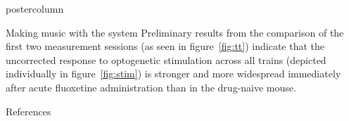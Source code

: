 \documentclass{beamer}
\begin{document}
\begin{frame}
\begin{columns}
\begin{column}{.57\textwidth}
\begin{beamercolorbox}[center]{postercolumn}
\begin{minipage}{.98\textwidth}
{					
					\begin{myblock}{Making music with the system}
						Preliminary results from the comparison of the first two measurement sessions (as seen in figure~\ref{fig:tt}) indicate that the uncorrected response to optogenetic stimulation across all trains (depicted individually in figure~\ref{fig:stim}) is stronger and more widespread immediately after acute fluoxetine administration than in the drug-naive mouse.
						
					\end{myblock}\vfill
					
					
					
					\begin{myblock}{References}
						\footnotesize
						
						
					\end{myblock}\vfill
		}\end{minipage}\end{beamercolorbox}
	\end{column}
\end{columns}
\end{frame}
\end{document}
